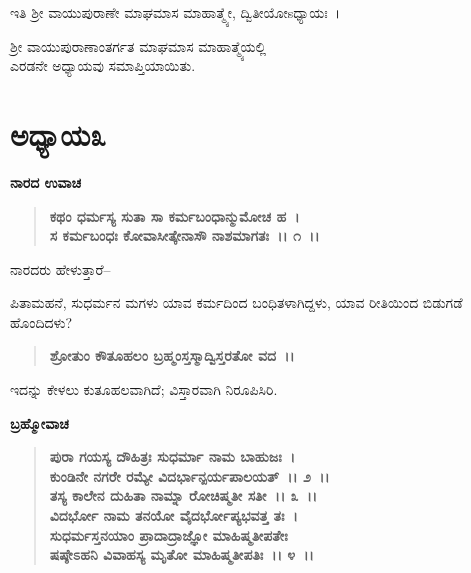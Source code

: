 \begin{center}
ಇತಿ ಶ‍್ರೀ ವಾಯುಪುರಾಣೇ ಮಾಘಮಾಸ ಮಾಹಾತ್ಮ್ಯೇ, ದ್ವಿತೀಯೋsಧ್ಯಾಯಃ~।
\end{center}

\begin{center}
ಶ‍್ರೀ ವಾಯುಪುರಾಣಾಂತರ್ಗತ ಮಾಘಮಾಸ ಮಾಹಾತ್ಮ್ಯೆಯಲ್ಲಿ \\ ಎರಡನೇ ಅಧ್ಯಾಯವು ಸಮಾಪ್ತಿಯಾಯಿತು.
\end{center}

\newpage

\section*{ಅಧ್ಯಾಯ೩}

\emptypage

\begin{flushleft}
\textbf{ನಾರದ ಉವಾಚ}
\end{flushleft}

\begin{verse}
\textbf{ಕಥಂ ಧರ್ಮಸ್ಯ ಸುತಾ ಸಾ ಕರ್ಮಬಂಧಾನ್ಮುಮೋಚ ಹ~।}\\\textbf{ಸ ಕರ್ಮಬಂಧಃ ಕೋವಾಸೀತ್ಕೇನಾಸೌ ನಾಶಮಾಗತಃ~।। ೧~।।}
\end{verse}

\begin{flushleft}
ನಾರದರು ಹೇಳುತ್ತಾರೆ–
\end{flushleft}

ಪಿತಾಮಹನೆ, ಸುಧರ್ಮನ ಮಗಳು ಯಾವ ಕರ್ಮದಿಂದ ಬಂಧಿತಳಾಗಿದ್ದಳು, ಯಾವ ರೀತಿಯಿಂದ ಬಿಡುಗಡೆ ಹೊಂದಿದಳು?

\begin{verse}
\textbf{ಶ್ರೋತುಂ ಕೌತೂಹಲಂ ಬ್ರಹ್ಮಂಸ್ತಸ್ಮಾದ್ವಿಸ್ತರತೋ ವದ~।।}
\end{verse}

ಇದನ್ನು ಕೇಳಲು ಕುತೂಹಲವಾಗಿದೆ; ವಿಸ್ತಾರವಾಗಿ ನಿರೂಪಿಸಿರಿ.

\begin{flushleft}
\textbf{ಬ್ರಹ್ಮೋವಾಚ}
\end{flushleft}

\begin{verse}
\textbf{ಪುರಾ ಗಯಸ್ಯ ದೌಹಿತ್ರಃ ಸುಧರ್ಮಾ ನಾಮ ಬಾಹುಜಃ~।}\\\textbf{ಕುಂಡಿನೇ ನಗರೇ ರಮ್ಯೇ ವಿದರ್ಭಾನ್ಪರ್ಯಪಾಲಯತ್~।। ೨~।। }\\\textbf{ತಸ್ಯ ಕಾಲೇನ ದುಹಿತಾ ನಾಮ್ನಾ ರೋಚಿಷ್ಮತೀ ಸತೀ~।। ೩~।।} \\\textbf{ವಿದರ್ಭೋ ನಾಮ ತನಯೋ ವೈದರ್ಭೋಪ್ಯಭವತ್ತ ತಃ~।} \\\textbf{ಸುಧರ್ಮಸ್ತನಯಾಂ ಪ್ರಾದಾದ್ರಾಜ್ಞೋ ಮಾಹಿಷ್ಮತೀಪತೇಃ} \\\textbf{ಷಷ್ಠೇಽಹನಿ ವಿವಾಹಸ್ಯ ಮೃತೋ ಮಾಹಿಷ್ಮತೀಪತಿಃ~।। ೪~।।}
\end{verse}

